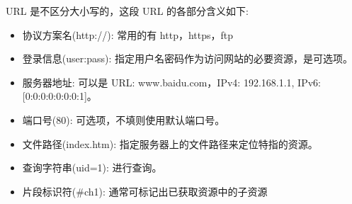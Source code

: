 URL 是不区分大小写的，这段 URL 的各部分含义如下:
\begin{itemize}
    \item 协议方案名(http://): 常用的有 http，https，ftp
    \item 登录信息(user:pass): 指定用户名密码作为访问网站的必要资源，是可选项。
    \item 服务器地址: 可以是 URL: www.baidu.com，IPv4: 192.168.1.1, IPv6: [0:0:0:0:0:0:0:1]。
    \item 端口号(80): 可选项，不填则使用默认端口号。
    \item 文件路径(index.htm): 指定服务器上的文件路径来定位特指的资源。
    \item 查询字符串(uid=1): 进行查询。
    \item 片段标识符(\#ch1): 通常可标记出已获取资源中的子资源
\end{itemize}

\newpage